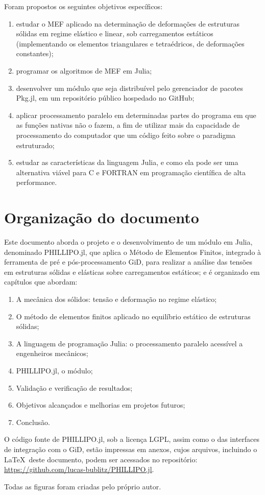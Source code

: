 Foram propostos os seguintes objetivos específicos:

\begin{enumerate}
    \item estudar o MEF aplicado na determinação de deformações de estruturas sólidas em regime elástico e linear, sob carregamentos estáticos (implementando os elementos triangulares e tetraédricos, de deformações constantes);
    \item programar os algoritmos de MEF em Julia;
    \item desenvolver um módulo que seja distribuível pelo gerenciador de pacotes Pkg.jl, em um repositório público hospedado no GitHub;
    \item aplicar processamento paralelo em determinadas partes do programa em que as funções nativas não o fazem, a fim de utilizar mais da capacidade de processamento do computador que um código feito sobre o paradigma estruturado;
    \item estudar as características da linguagem Julia, e como ela pode ser uma alternativa viável para C e FORTRAN em programação científica de alta performance.
\end{enumerate}

\section{Organização do documento}

Este documento aborda o projeto e o desenvolvimento de um módulo em Julia, denominado PHILLIPO.jl, que aplica o Método de Elementos Finitos, integrado à ferramenta de pré e pós-processamento GiD, para realizar a análise das tensões em estruturas sólidas e elásticas sobre carregamentos estáticos; e é organizado em capítulos que abordam:

\begin{enumerate}
    \item A mecânica dos sólidos: tensão e deformação no regime elástico;
    \item O método de elementos finitos aplicado no equilíbrio estático de estruturas sólidas;
    \item A linguagem de programação Julia: o processamento paralelo acessível a engenheiros mecânicos;
    \item PHILLIPO.jl, o módulo;
    \item Validação e verificação de resultados;
    \item Objetivos alcançados e melhorias em projetos futuros;
    \item Conclusão.
\end{enumerate}

O código fonte de PHILLIPO.jl, sob a licença LGPL, assim como o das interfaces de integração com o GiD, estão impressas em anexos, cujos arquivos, incluindo o \LaTeX\ deste documento, podem ser acessados no repositório: \url{https://github.com/lucas-bublitz/PHILLIPO.jl}.

Todas as figuras foram criadas pelo próprio autor.